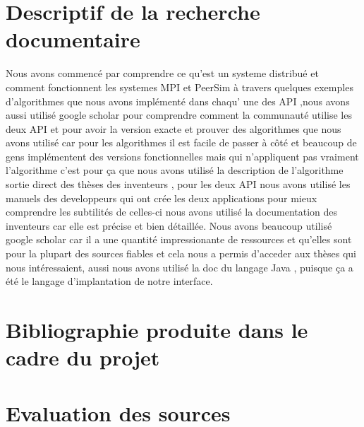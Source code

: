 \documentclass{article}
\begin{document}
		\section{Descriptif de la recherche documentaire}
		\indent Nous avons commencé par comprendre ce qu'est un systeme distribué et comment fonctionnent les systemes MPI et PeerSim à travers quelques exemples d'algorithmes que nous avons implémenté dans chaqu'
		\indent une des API ,nous avons aussi utilisé google scholar pour comprendre comment la communauté utilise les deux API et pour avoir la version exacte et prouver des algorithmes que nous avons utilisé
		\indent car pour les algorithmes il est facile de passer à côté et beaucoup de gens implémentent des versions fonctionnelles mais qui n'appliquent pas vraiment l'algorithme c'est pour ça que nous avons utilisé
		\indent la description de l'algorithme sortie direct des thèses des inventeurs , pour les deux API nous avons utilisé les manuels des developpeurs qui ont crée les deux applications pour mieux comprendre 
		\indent les subtilités de celles-ci nous avons utilisé la documentation des inventeurs car elle est précise et bien détaillée.
		\newline
		\indent Nous avons beaucoup utilisé google scholar car il a une quantité impressionante de ressources et qu'elles sont pour la plupart des sources fiables et cela nous a permis d'acceder aux thèses qui nous
		\indent intéressaient, aussi nous avons utilisé la doc du langage Java , puisque ça a été le langage d'implantation de notre interface.

		
		\section{Bibliographie produite dans le cadre du projet}

		\section{Evaluation des sources}
\end{document}
